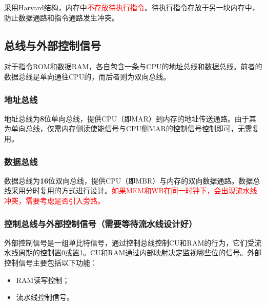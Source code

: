 \documentclass[lang=cn,a4paper,newtx]{elegantpaper}
\begin{document}
采用Harvard结构，内存中\textcolor{red}{不存放待执行指令}。待执行指令存放于另一块内存中，防止数据通路和指令通路发生冲突。
\subsection{总线与外部控制信号}\label{sec:ExternalControl}
对于指令ROM和数据RAM，各自包含一条与CPU的地址总线和数据总线。前者的数据总线是单向通往CPU的，而后者则为双向总线。
\subsubsection{地址总线}
地址总线为\textbf{8}位单向总线，提供CPU（即MAR）到内存的地址传送通路。由于其为单向总线，仅需内存侧读使能信号与CPU侧MAR的控制信号控制即可，无需复用。
\subsubsection{数据总线}
数据总线为\textbf{16}位双向总线，提供CPU（即MBR）与内存的双向数据通路。数据总线采用分时复用的方式进行设计。\textcolor{red}{如果MEM和WB在同一时钟下，会出现流水线冲突，需要考虑是否引入旁路。}
\subsubsection{控制总线与外部控制信号（需要等待流水线设计好）}
外部控制信号是一组单比特信号，通过控制总线控制CU和RAM的行为，它们受流水线周期的控制置0或置1。CU和RAM通过内部映射决定监视哪些位的信号。外部控制信号主要包括以下功能：
\begin{itemize}
  \item RAM读写控制；
  \item 流水线控制信号。
\end{itemize}
\end{document}
